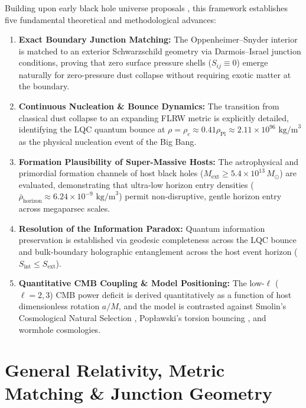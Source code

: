 \documentclass[11pt,a4paper]{article}
\theoremstyle{definition}
\begin{document}
Building upon early black hole universe proposals \cite{pathria1972, smolin1992, poplawski2010, poplawski2016, gaztanaga2022}, this framework establishes five fundamental theoretical and methodological advances:
\begin{enumerate}
    \item \textbf{Exact Boundary Junction Matching:} The Oppenheimer--Snyder interior is matched to an exterior Schwarzschild geometry via Darmois--Israel junction conditions, proving that zero surface pressure shells ($S_{ij} \equiv 0$) emerge naturally for zero-pressure dust collapse without requiring exotic matter at the boundary.
    \item \textbf{Continuous Nucleation \& Bounce Dynamics:} The transition from classical dust collapse to an expanding FLRW metric is explicitly detailed, identifying the LQC quantum bounce at $\rho = \rho_c \approx 0.41 \rho_{\text{Pl}} \approx 2.11 \times 10^{96} \text{ kg/m}^3$ as the physical nucleation event of the Big Bang.
    \item \textbf{Formation Plausibility of Super-Massive Hosts:} The astrophysical and primordial formation channels of host black holes ($M_{\text{ext}} \ge 5.4 \times 10^{13} \, M_\odot$) are evaluated, demonstrating that ultra-low horizon entry densities ($\bar{\rho}_{\text{horizon}} \approx 6.24 \times 10^{-9} \text{ kg/m}^3$) permit non-disruptive, gentle horizon entry across megaparsec scales.
    \item \textbf{Resolution of the Information Paradox:} Quantum information preservation is established via geodesic completeness across the LQC bounce and bulk-boundary holographic entanglement across the host event horizon ($S_{\text{int}} \le S_{\text{ext}}$).
    \item \textbf{Quantitative CMB Coupling \& Model Positioning:} The low-$\ell$ ($\ell=2,3$) CMB power deficit is derived quantitatively as a function of host dimensionless rotation $a/M$, and the model is contrasted against Smolin's Cosmological Natural Selection \cite{smolin1992}, Pop\l awski's torsion bouncing \cite{poplawski2010, poplawski2016}, and wormhole cosmologies.
\end{enumerate}

\section{General Relativity, Metric Matching \& Junction Geometry}\label{sec:junction}
\end{document}

